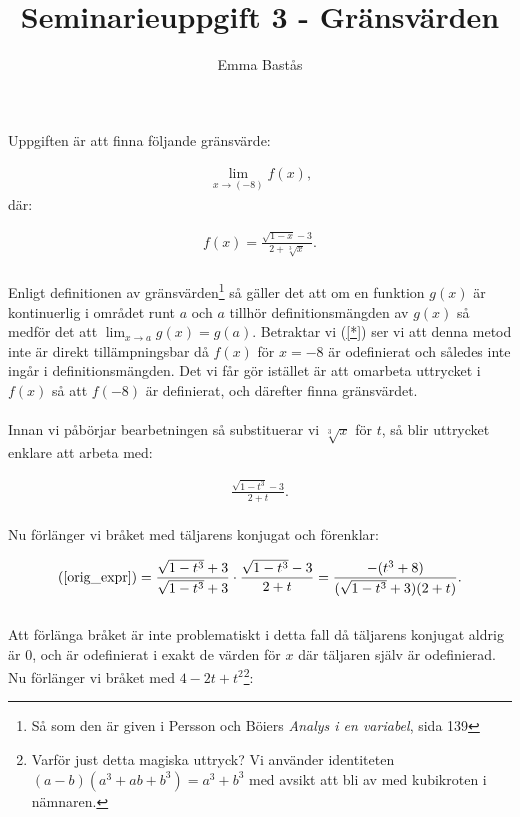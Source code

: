 \documentclass{article}
\title{Seminarieuppgift 3 - Gränsvärden}
\author{Emma Bastås}
\begin{document}
\maketitle

\noindent Uppgiften är att finna följande gränsvärde:

\begin{gather*}
  \lim_{x \to (-8)}f(x)\text{,} \label{*}\tag{$\star$}
\end{gather*}
där:

\begin{gather*}
  f(x) = \frac {\sqrt{1 - x} - 3} {2 + \sqrt[3]{x}} \text{.}
\end{gather*}
\\
Enligt definitionen av gränsvärden\footnote{Så som den är given i Persson och Böiers \emph{Analys i en variabel}, sida 139} så gäller det att om en funktion $g(x)$ är kontinuerlig i området runt $a$ och $a$ tillhör definitionsmängden av $g(x)$ så medför det att $\lim_{x \to a}g(x) = g(a)$. Betraktar vi (\ref{*}) ser vi att denna metod inte är direkt tillämpningsbar då $f(x)$ för $x = -8$ är odefinierat och således inte ingår i definitionsmängden. Det vi får gör istället är att omarbeta uttrycket i $f(x)$ så att $f(-8)$ är definierat, och därefter finna gränsvärdet.
\\
\\
Innan vi påbörjar bearbetningen så substituerar vi $\sqrt[3]{x}$ för $t$, så blir uttrycket enklare att arbeta med:

\begin{gather}
  \frac{\sqrt{1 - t^{3}} - 3}{2 + t}\text{.} \label{orig_expr}
\end{gather}
\\
Nu förlänger vi bråket med täljarens konjugat och förenklar:

\begin{gather}
  \text{(\ref{orig_expr})} = \frac{\sqrt{1 - t^{3}} + 3}{\sqrt{1 - t^{3}} + 3} \cdot \frac{\sqrt{1 - t^{3}} - 3}{2 + t}
  = \frac{- (t^{3} + 8)}{(\sqrt{1 - t^{3}} + 3)(2 + t)}\text{.} \label{ext1}
\end{gather}
\\
Att förlänga bråket är inte problematiskt i detta fall då täljarens konjugat aldrig är $0$, och är odefinierat i exakt de värden för $x$ där täljaren själv är odefinierad.
\\
Nu förlänger vi bråket med $4 - 2t + t^{2}$\footnote{Varför just detta magiska uttryck? Vi använder identiteten $(a - b)(a^{3} + ab + b^{3}) = a^{3} + b^{3}$ med avsikt att bli av med kubikroten i nämnaren.}:
\end{document}
